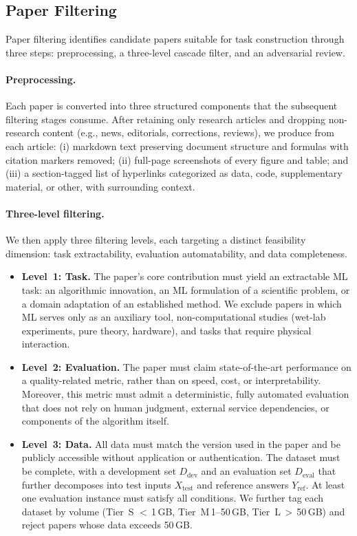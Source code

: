 \subsection{Paper Filtering}
\label{sec:gym:filter}


Paper filtering identifies candidate papers suitable for task construction through three steps: preprocessing, a three-level cascade filter, and an adversarial review.

\paragraph{Preprocessing.}

Each paper is converted into three structured components that the subsequent filtering stages consume.
After retaining only research articles and dropping non-research content (e.g., news, editorials, corrections, reviews), we produce from each article: (i) markdown text preserving document structure and formulas with citation markers removed;
(ii) full-page screenshots of every figure and table;
and (iii) a section-tagged list of hyperlinks categorized as data, code, supplementary material, or other, with surrounding context.


\paragraph{Three-level filtering.}
We then apply three filtering levels, each targeting a distinct feasibility dimension: task extractability, evaluation automatability, and data completeness.

\begin{itemize}[topsep=0pt, partopsep=0pt, leftmargin=12pt, itemsep=5pt]
\item \textbf{Level~1: Task.} The paper's core contribution must yield an extractable ML task: an algorithmic innovation, an ML formulation of a scientific problem, or a domain adaptation of an established method. We exclude papers in which ML serves only as an auxiliary tool, non-computational studies (wet-lab experiments, pure theory, hardware), and tasks that require physical interaction.

\item \textbf{Level~2: Evaluation.} The paper must claim state-of-the-art performance on a quality-related metric, rather than on speed, cost, or interpretability. Moreover, this metric must admit a deterministic, fully automated evaluation that does not rely on human judgment, external service dependencies, or components of the algorithm itself.

\item \textbf{Level~3: Data.} All data must match the version used in the paper and be publicly accessible without application or authentication. The dataset must be complete, with a development set $D_\text{dev}$ and an evaluation set $D_\text{eval}$ that further decomposes into test inputs $X_\text{test}$ and reference answers $Y_\text{ref}$. At least one evaluation instance must satisfy all conditions. We further tag each dataset by volume (Tier~S $<$\,1\,GB, Tier~M\,1--50\,GB, Tier~L\,$>$\,50\,GB) and reject papers whose data exceeds 50\,GB.
\end{itemize}

